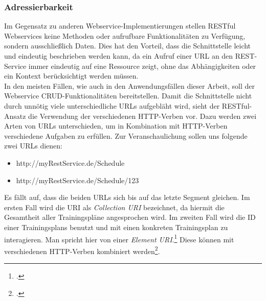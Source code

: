 \subsubsection*{Adressierbarkeit}
Im Gegensatz zu anderen Webservice-Implementierungen stellen RESTful Webservices keine Methoden oder aufrufbare Funktionalitäten zu Verfügung, sondern ausschließlich Daten. Dies hat den Vorteil, dass die Schnittstelle leicht und eindeutig beschrieben werden kann, da ein Aufruf einer URL an den REST-Service immer eindeutig auf eine Ressource zeigt, ohne das Abhängigkeiten oder ein Kontext berücksichtigt werden müssen. \\
In den meisten Fällen, wie auch in den Anwendungsfällen dieser Arbeit, soll der Webservice \ac{CRUD}-Funktionalitäten bereitstellen. Damit die Schnittstelle nicht durch unnötig viele unterschiedliche URLs aufgebläht wird, sieht der RESTful-Ansatz die Verwendung der verschiedenen HTTP-Verben vor. Dazu werden zwei Arten von URLs unterschieden, um in Kombination mit HTTP-Verben verschiedene Aufgaben zu erfüllen. Zur Veranschaulichung sollen uns folgende zwei URLs dienen:
\begin{itemize}
\item http://myRestService.de/Schedule
\item http://myRestService.de/Schedule/123
\end{itemize}
Es fällt auf, dass die beiden URLs sich bis auf das letzte Segment gleichen. Im ersten Fall wird die URI als \textit{Collection URI} bezeichnet, da hiermit die Gesamtheit aller Trainingspläne angesprochen wird. Im zweiten Fall wird die ID einer Trainingsplans benutzt und mit einen konkreten Trainingsplan zu interagieren. Man spricht hier von einer \textit{Element URI}.\footcite[S. 12ff.]{Building-a-REST-Service} Diese können mit verschiedenen HTTP-Verben kombiniert werden\footcite[S. 26ff.]{REST-und-HTTP}.

